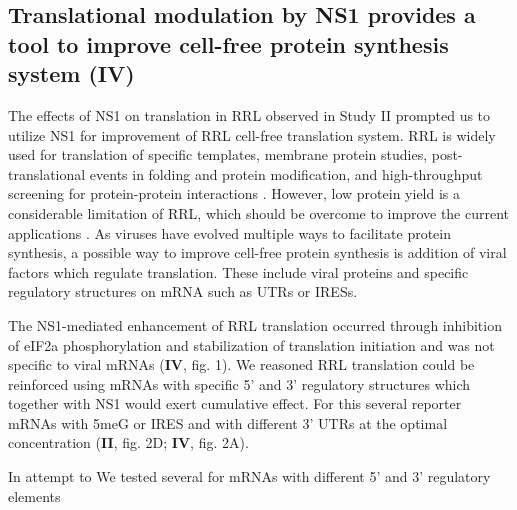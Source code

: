 	
	\subsection{Translational modulation by NS1 provides a tool to improve cell-free protein synthesis system (IV)}
	
		The effects of NS1 on translation in \gls{RRL} observed in Study II prompted us to utilize NS1 for improvement of \gls{RRL} cell-free translation system. \gls{RRL} is widely used for translation of specific templates, membrane protein studies, post-translational events in folding and protein modification, and high-throughput screening for protein-protein interactions \parencite{Fuller2000, Douthwaite2012, Fixsen2010, Wang2011}. However, low protein yield is a considerable limitation of RRL, which should be overcome to improve the current applications \parencite{Carlson2012}. As viruses have evolved multiple ways to facilitate protein synthesis, a possible way to improve cell-free protein synthesis is addition of viral factors which regulate translation. These include viral proteins and specific regulatory structures on mRNA such as \gls{UTR}s or \glspl{IRES}. 
	
		The NS1-mediated enhancement of \gls{RRL} translation occurred through inhibition of \gls{eIF2a} phosphorylation and stabilization of translation initiation and was not specific to viral mRNAs (\textbf{IV}, fig. 1). We reasoned RRL translation could be reinforced using mRNAs with specific 5' and 3' regulatory structures which together with NS1 would exert cumulative effect. For this several reporter mRNAs with \gls{5meG} or \gls{IRES} and with different 3' \gls{UTR}s at the optimal concentration (\textbf{II}, fig. 2D; \textbf{IV}, fig. 2A).
		
		In attempt to We tested several for mRNAs with different 5' and 3' regulatory elements


